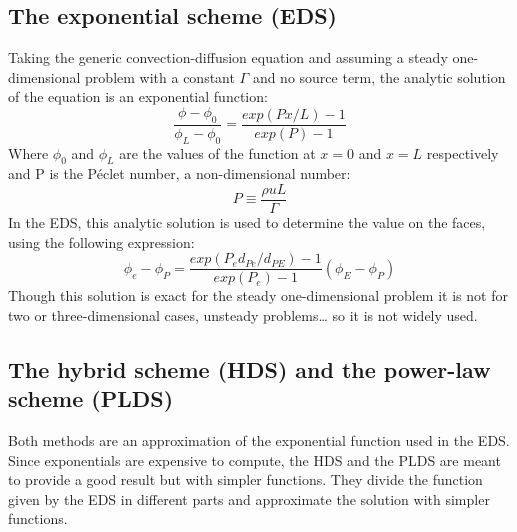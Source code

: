 \subsection{The exponential scheme (EDS)}
Taking the generic convection-diffusion equation and assuming a steady one-dimensional problem with a constant $\Gamma$ and no source term, the analytic solution of the equation is an exponential function:
\begin{equation}
\frac{\phi-\phi_{0}}{\phi_{L}-\phi_{0}}=\frac{exp\left(Px/L\right)-1}{exp\left(P\right)-1}
\end{equation}
Where $\phi_{0}$ and $\phi_{L}$ are the values of the function at $x=0$ and $x=L$ respectively and P is the Péclet number, a non-dimensional number:
\begin{equation}
P\equiv\frac{\rho uL}{\Gamma}
\end{equation}
In the EDS, this analytic solution is used to determine the value on the faces, using the following expression:
\begin{equation}
\phi_{e}-\phi_{P}=\frac{exp\left(P_{e}d_{Pe}/d_{PE}\right)-1}{exp\left(P_{e}\right)-1}\left(\phi_{E}-\phi_{P}\right)
\end{equation}
Though this solution is exact for the steady one-dimensional problem it is not for two or three-dimensional cases, unsteady problems… so it is not widely used.

\subsection{The hybrid scheme (HDS) and the power-law scheme (PLDS)}
Both methods are an approximation of the exponential function used in the EDS. Since exponentials are expensive to compute, the HDS and the PLDS are meant to provide a good result but with simpler functions. They divide the function given by the EDS in different parts and approximate the solution with simpler functions.